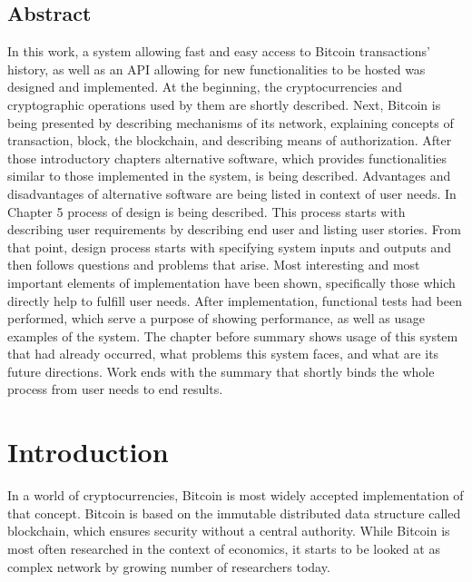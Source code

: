 \documentclass[12pt, en, eng, twoside, final]{mgr}
\begin{document}
\section*{Abstract}

In this work, a system allowing fast and easy access to Bitcoin transactions' history, as well as an API allowing for new functionalities to be hosted was designed and implemented. At the beginning, the cryptocurrencies and cryptographic operations used by them are shortly described. Next, Bitcoin is being presented by describing mechanisms of its network, explaining concepts of transaction, block, the blockchain, and describing means of authorization. After those introductory chapters alternative software, which provides functionalities similar to those implemented in the system, is being described. Advantages and disadvantages of alternative software are being listed in context of user needs. In Chapter 5 process of design is being described. This process starts with describing user requirements by describing end user and listing user stories. From that point, design process starts with specifying system inputs and outputs and then follows questions and problems that arise. Most interesting and most important elements of implementation have been shown, specifically those which directly help to fulfill user needs. After implementation, functional tests had been performed, which serve a purpose of showing performance, as well as usage examples of the system. The chapter before summary shows usage of this system that had already occurred, what problems this system faces, and what are its future directions. Work ends with the summary that shortly binds the whole process from user needs to end results.

\chapter{Introduction}

In a world of cryptocurrencies, Bitcoin is most widely accepted implementation of that concept. Bitcoin is based on the immutable distributed data structure called blockchain, which ensures security without a central authority. While Bitcoin is most often researched in the context of economics, it starts to be looked at as complex network by growing number of researchers today. 
\end{document}
